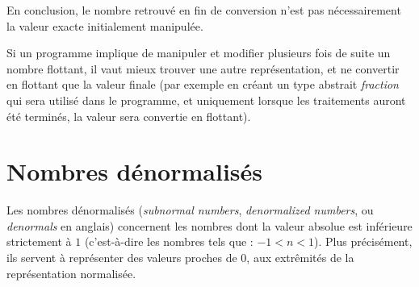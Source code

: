 \documentclass[11pt,a4paper]{article}
\begin{document}
\medskip

En conclusion, le nombre retrouvé en fin de conversion n'est pas nécessairement la valeur exacte initialement manipulée.

\medskip

Si un programme implique de manipuler et modifier plusieurs fois de suite un nombre flottant, il vaut mieux trouver une autre représentation, et ne convertir en flottant que la valeur finale (par exemple en créant un type abstrait \og \textit{fraction} \fg{} qui sera utilisé dans le programme, et uniquement lorsque les traitements auront été terminés, la valeur sera convertie en flottant).



\bigskip


\clearpage


\section{Nombres dénormalisés}

\bigskip

Les nombres dénormalisés (\textit{subnormal numbers}, \textit{denormalized numbers}, ou \textit{denormals} en anglais) concernent les nombres dont la valeur absolue est inférieure strictement à $ 1 $ (c'est-à-dire les nombres tels que : $ -1 < n < 1 $).
Plus précisément, ils servent à représenter des valeurs proches de $ 0 $, aux extrêmités de la représentation normalisée.
\end{document}
